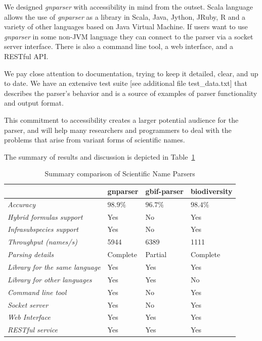 \documentclass{bmcart}
\begin{document}
We designed \textit{gnparser} with accessibility in mind from the outset. Scala
language allows the use of \textit{gnparser} as a library in Scala, Java,
Jython, JRuby, R and a variety of other languages based on Java Virtual
Machine. If users want to use \textit{gnparser}  in some non-JVM language
they can connect to the parser via a socket server interface. There is also a
command line tool, a web interface, and a RESTful API.

We pay close attention to documentation, trying to keep it detailed, clear, and
up to date. We have an extensive test suite [see additional file
test\_data.txt] that describes the parser's behavior and is a source of
examples of parser functionality and output format.

This commitment to accessibility creates a larger potential audience for the
parser, and will help many researchers and programmers to deal with the
problems that arise from variant forms of scientific names.

The summary of results and discussion is depicted in
Table~\ref{table:summary}

\begin{table}[htb]
  \begin{center}
    \caption{Summary comparison of Scientific Name Parsers}
    \label{table:summary}
    \resizebox{12.5cm}{!} {\begin{tabular}{|l|*{3}{l}|}
      \hline
                             & gnparser & gbif-parser & biodiversity \\
      \hline
      \textit{Accuracy}                     & $98.9\%$ & $96.7\%$ & $98.4\%$\\
      \textit{Hybrid formulas support}      & Yes      & No       & Yes     \\
      \textit{Infrasubspecies support}      & Yes      & No       & Yes     \\
      \textit{Throughput (names/s)}         & 5944     & 6389     & 1111    \\
      \textit{Parsing details}              & Complete & Partial  & Complete\\
      \textit{Library for the same language}& Yes      & Yes      & Yes     \\
      \textit{Library for other languages}  & Yes      & Yes      & No      \\
      \textit{Command line tool}            & Yes      & No       & Yes     \\
      \textit{Socket server}                & Yes      & No       & Yes     \\
      \textit{Web Interface}                & Yes      & Yes      & Yes     \\
      \textit{RESTful service}              & Yes      & Yes      & Yes     \\
      \hline
    \end{tabular}
  }
  \end{center}
\end{table}
\end{document}
